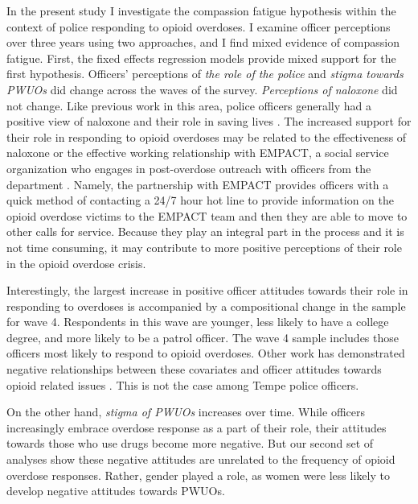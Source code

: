 In the present study I investigate the compassion fatigue hypothesis within the context of police responding to opioid overdoses. I examine officer perceptions over three years using two approaches, and I find mixed evidence of compassion fatigue. First, the fixed effects regression models provide mixed support for the first hypothesis. Officers' perceptions of \textit{the role of the police} and \textit{stigma towards PWUOs} did change across the waves of the survey. \textit{Perceptions of naloxone} did not change. Like previous work in this area, police officers generally had a positive view of naloxone and their role in saving lives \parencite{white_narcan_2021, pourtaher_naloxone_2022, reichert_police_2023}. The increased support for their role in responding to opioid overdoses may be related to the effectiveness of naloxone \parencite{white_leveraging_2022} or the effective working relationship with EMPACT, a social service organization who engages in post-overdose outreach with officers from the department \parencite{white_moving_2021}. Namely, the partnership with EMPACT provides officers with a quick method of contacting a 24/7 hour hot line to provide information on the opioid overdose victims to the EMPACT team and then they are able to move to other calls for service. Because they play an integral part in the process and it is not time consuming, it may contribute to more positive perceptions of their role in the opioid overdose crisis.

Interestingly, the largest increase in positive officer attitudes towards their role in responding to overdoses is accompanied by a compositional change in the sample for wave 4. Respondents in this wave are younger, less likely to have a college degree, and more likely to be a patrol officer. The wave 4 sample includes those officers most likely to respond to opioid overdoses. Other work has demonstrated negative relationships between these covariates and officer attitudes towards opioid related issues \parencite{kruis_police_2020, reichert_police_2023}. This is not the case among Tempe police officers.

On the other hand, \textit{stigma of PWUOs} increases over time. While officers increasingly embrace overdose response as a part of their role, their attitudes towards those who use drugs become more negative. But our second set of analyses show these negative attitudes are unrelated to the frequency of opioid overdose responses.  Rather, gender played a role, as women were less likely to develop negative attitudes towards PWUOs. 


